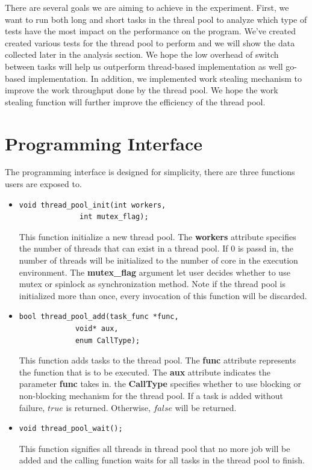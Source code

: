 \documentclass[journal, a4paper]{IEEEtran}
\begin{document}
	There are several goals we are aiming to achieve in the experiment. First, we want to run both long and short tasks in the threal pool to analyze which type of tests have the most impact on the performance on the program. We've created created various tests for the thread pool to perform and we will show the data collected later in the analysis section. We hope the low overhead of switch between tasks will help us outperform thread-based implementation as well go-based implementation. In addition, we implemented work stealing mechanism to improve the work throughput done by the thread pool. We hope the work stealing function will further improve the efficiency of the thread pool. 
	
\section{Programming Interface}
The programming interface is designed for simplicity, there are three functions users are exposed to.\\

\begin{itemize}
	\item \begin{lstlisting}
void thread_pool_init(int workers, 
		      int mutex_flag);
	\end{lstlisting}
	This function initialize a new thread pool. The \textbf{workers} attribute specifies the number of threads that can exist in a thread pool. If $0$ is passd in, the number of threads will be initialized to the number of core in the execution environment. The \textbf{mutex\_flag} argument let user decides whether to use mutex or spinlock as synchronization method. Note if the thread pool is initialized more than once, every invocation of this function will be discarded.\\
	\item 
	\begin{lstlisting}
bool thread_pool_add(task_func *func,
		     void* aux,
		     enum CallType);
	\end{lstlisting}
	This function adds tasks to the thread pool. The \textbf{func} attribute represents the function that is to be executed. The \textbf{aux} attribute indicates the parameter \textbf{func} takes in. the \textbf{CallType} specifies whether to use blocking or non-blocking mechanism for the thread pool. If a task is added without failure, $true$ is returned. Otherwise, $false$ will be returned.\\
	\item \begin{lstlisting}
void thread_pool_wait();
	\end{lstlisting}
	This function signifies all threads in thread pool that no more job will be added and the calling function waits for all tasks in the thread pool to finish.
\end{itemize}
\end{document}

